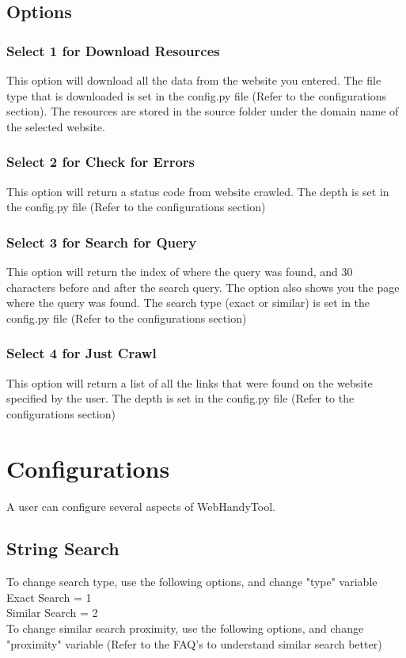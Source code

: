 \documentclass[12pt, titlepage]{article}
\begin{document}
\subsection{Options}
\subsubsection{Select 1 for Download Resources }
This option will download all the data from the website you entered. The file type that is downloaded is set in the config.py file (Refer to the configurations section). The resources are stored in the source folder under the domain name of the selected website.\\
\subsubsection{Select 2 for Check for Errors}
This option will return a status code from website crawled. The depth is set in the config.py file (Refer to the configurations section)\\
\subsubsection{Select 3 for Search for Query}
This option will return the index of where the query was found, and 30 characters before and after the search query. The option also shows you the page where the query was found. The search type (exact or similar) is set in the config.py file (Refer to the configurations section)\\
\subsubsection{Select 4 for Just Crawl }
This option will return a list of all the links that were found on the website specified by the user.  The depth is set in the config.py file (Refer to the configurations section)\\

\pagebreak

\section{Configurations}
A user can configure several aspects of WebHandyTool.
\subsection{String Search} 
To change search type, use the following options, and change "type" variable \\
Exact Search = 1\\
Similar Search = 2\\
To change similar search proximity, use the following options, and change "proximity" variable (Refer to the FAQ's to understand similar search better)\\
\end{document}
